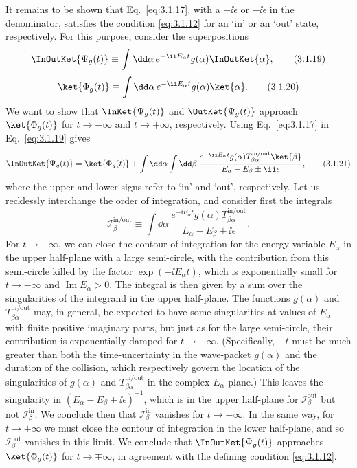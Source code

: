 It remains to be shown that Eq.~\eqref{eq:3.1.17}, with a $+\ii\epsilon$ or
$-\ii\epsilon$ in the denominator, satisfies the condition \eqref{eq:3.1.12} for an
`in' or an `out' state, respectively. For this purpose, consider the
superpositions
\begin{equation}
\InOutKet{\Psi_g(t)}
\equiv\int \dd\alpha\,e^{-\ii E_\alpha t}g(\alpha)
\InOutKet{\alpha},
\tag{3.1.19}\label{eq:3.1.19}
\end{equation}
\begin{equation}
\ket{\Phi_g(t)}\equiv
\int \dd\alpha\,e^{-\ii E_\alpha t}g(\alpha)\ket{\alpha}.
\tag{3.1.20}\label{eq:3.1.20}
\end{equation}
We want to show that $\InKet{\Psi_g(t)}$ and
$\OutKet{\Psi_g(t)}$ approach $\ket{\Phi_g(t)}$ for
$t\to-\infty$ and $t\to+\infty$, respectively. Using Eq.~\eqref{eq:3.1.17} in
Eq.~\eqref{eq:3.1.19} gives
\begin{align}
\InOutKet{\Psi_g(t)}
=\ket{\Phi_g(t)}+\int \dd\alpha\int \dd\beta\,
\frac{e^{-\ii E_\alpha t}g(\alpha)
T^{\mathrm{in/out}}_{\beta\alpha}\ket{\beta}}
{E_\alpha-E_\beta\mathbin{\pm}\ii\epsilon},
\tag{3.1.21}\label{eq:3.1.21}
\end{align}
where the upper and lower signs refer to `in' and `out', respectively. Let us
recklessly interchange the order of integration, and consider first the
integrals
\[
\mathcal{I}^{\mathrm{in/out}}_\beta\equiv
\int \dd\alpha\,
\frac{e^{-\ii E_\alpha t}g(\alpha)
T^{\mathrm{in/out}}_{\beta\alpha}}
{E_\alpha-E_\beta\mathbin{\pm}\ii\epsilon}.
\]
For $t\to-\infty$, we can close the contour of integration for the energy
variable $E_\alpha$ in the upper half-plane with a large semi-circle, with the
contribution from this semi-circle killed by the factor
$\exp(-\ii E_\alpha t)$, which is exponentially small for $t\to-\infty$ and
$\operatorname{Im}E_\alpha>0$. The integral is then given by a sum over the
singularities of the integrand in the upper half-plane. The functions
$g(\alpha)$ and $T^{\mathrm{in/out}}_{\beta\alpha}$ may, in general, be
expected to have some singularities at values of $E_\alpha$ with finite
positive imaginary parts, but just as for the large semi-circle, their
contribution is exponentially damped for $t\to-\infty$. (Specifically, $-t$
must be much greater than both the time-uncertainty in the wave-packet
$g(\alpha)$ and the duration of the collision, which respectively govern the
location of the singularities of $g(\alpha)$ and
$T^{\mathrm{in/out}}_{\beta\alpha}$ in the complex $E_\alpha$ plane.) This
leaves the singularity in
$(E_\alpha-E_\beta\mathbin{\pm}\ii\epsilon)^{-1}$, which is in the upper
half-plane for $\mathcal{I}^{\mathrm{out}}_\beta$ but not
$\mathcal{I}^{\mathrm{in}}_\beta$. We conclude then that
$\mathcal{I}^{\mathrm{in}}_\beta$ vanishes for $t\to-\infty$. In the same
way, for $t\to+\infty$ we must close the contour of integration in the lower
half-plane, and so $\mathcal{I}^{\mathrm{out}}_\beta$ vanishes in this limit.
We conclude that $\InOutKet{\Psi_g(t)}$ approaches
$\ket{\Phi_g(t)}$ for $t\to\mp\infty$, in agreement with the defining
condition \eqref{eq:3.1.12}.

